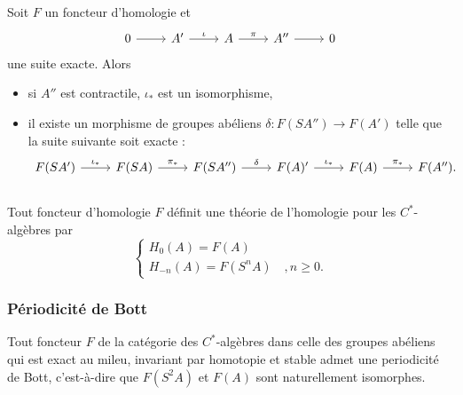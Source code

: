\begin{prop}
Soit $F$ un foncteur d'homologie et \[\begin{tikzcd}
0\arrow{r} & A' \arrow{r}{\iota} & A \arrow{r}{\pi} & A'' \arrow{r} & 0
\end{tikzcd}\]
une suite exacte. Alors 
\begin{itemize}
\item si $A''$ est contractile, $ \iota_*$ est un isomorphisme,
\item il existe un morphisme de groupes abéliens $\delta : F(SA'')\rightarrow F(A')$ telle que la suite suivante soit exacte :
\[\begin{tikzcd}[row sep = small]
F(SA') \arrow{r}{\iota_*} & F(SA) \arrow{r}{\pi_*} & F(SA'') \arrow{r}{\delta} & F(A)' \arrow{r}{\iota_*} & F(A) \arrow{r}{\pi_*} & F(A'').\\
\end{tikzcd}\] 
\end{itemize}
\end{prop}

\begin{cor}Tout foncteur d'homologie $F$ définit une théorie de l'homologie pour les $C^*$-algèbres par 
\[\left\{\begin{array}{c} H_0(A)=F(A) \\ H_{-n}(A) = F(S^n A)\quad, n\geq 0.\end{array}\right.\]
\end{cor}

\subsubsection{Périodicité de Bott}

\begin{thm}Tout foncteur $F$ de la catégorie des $C^*$-algèbres dans celle des groupes abéliens qui est exact au mileu, invariant par homotopie et stable admet une periodicité de Bott, c'est-à-dire que $F(S^2 A)$ et $F(A)$ sont naturellement isomorphes.\end{thm}


